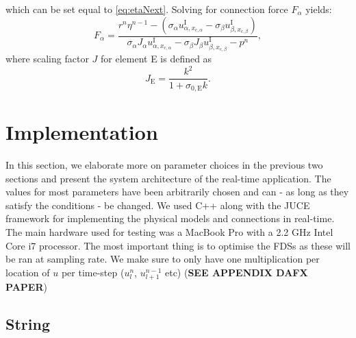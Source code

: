 \documentclass{article}
\begin{document}
which can be set equal to \eqref{eq:etaNext}. Solving for connection force $F_\alpha$ yields:
\begin{equation}
    F_\alpha = \frac{r^n\eta^{n-1}-(\sigma_\alpha u_{\alpha, x_{\text{c},\alpha}}^\text{I} - \sigma_\beta u_{\beta,x_{\text{c},\beta}}^\text{I})}{\sigma_\alpha J_\alpha u_{\alpha, x_{\text{c},\alpha}}^\text{I} - \sigma_\beta J_\beta u_{\beta,x_{\text{c},\beta}}^\text{I}-p^n},
\end{equation}
where scaling factor $J$ for element E is defined as
\begin{equation}
    J_\text{E} = \frac{k^2}{1+\sigma_{0,\text{E}}k}.
\end{equation}
\section{Implementation}\label{sec:implementation}
In this section, we elaborate more on parameter choices in the previous two sections and present the system architecture of the real-time application. The values for most parameters have been arbitrarily chosen and can - as long as they satisfy the conditions - be changed. We used C++ along with the JUCE framework \cite{JUCE2019} for implementing the physical models and connections in real-time. The main hardware used for testing was a MacBook Pro with a 2.2 GHz Intel Core i7 processor.
The most important thing is to optimise the FDSs as these will be ran at sampling rate. We make sure to only have one multiplication per location of $u$ per time-step ($u_l^n$, $u_{l+1}^{n-1}$ etc) (\textbf{SEE APPENDIX DAFX PAPER}) %
\subsection{String}
\end{document}
